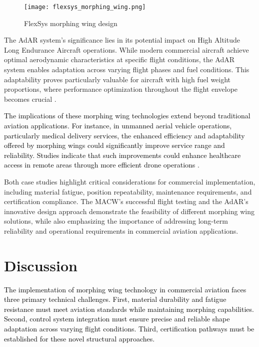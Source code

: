 \documentclass[letterpaper, journal, twoside]{IEEEtran}
\newcommand{\revision}[1]{\textcolor{black}{ #1}}
\begin{document}
\begin{figure}
    \centering
    \texttt{[image: flexsys\_morphing\_wing.png]}
    \caption{FlexSys morphing wing design~\cite{flexsys2024flexfoil}}
    \label{fig:flexsys_morphing_wing}
\end{figure}


The AdAR system's significance lies in its potential impact on High Altitude Long Endurance Aircraft operations. While modern commercial aircraft achieve optimal aerodynamic characteristics at specific flight conditions, the AdAR system enables adaptation across varying flight phases and fuel conditions. This adaptability proves particularly valuable for aircraft with high fuel weight proportions, where performance optimization throughout the flight envelope becomes crucial \cite{woods2015adaptive}.

\revision{The implications of these morphing wing technologies extend beyond traditional aviation applications. For instance, in unmanned aerial vehicle operations, particularly medical delivery services, the enhanced efficiency and adaptability offered by morphing wings could significantly improve service range and reliability. Studies indicate that such improvements could enhance healthcare access in remote areas through more efficient drone operations} \cite{ling2019aerial}.

Both case studies highlight critical considerations for commercial implementation, including material fatigue, position repeatability, maintenance requirements, and certification compliance. The MACW's successful flight testing and the AdAR's innovative design approach demonstrate the feasibility of different morphing wing solutions, while also emphasizing the importance of addressing long-term reliability and operational requirements in commercial aviation applications.

\section{Discussion}\label{sec:discussion}
\revision{The implementation of morphing wing technology in commercial aviation faces three primary technical challenges. First, material durability and fatigue resistance must meet aviation standards while maintaining morphing capabilities. Second, control system integration must ensure precise and reliable shape adaptation across varying flight conditions. Third, certification pathways must be established for these novel structural approaches.}
\end{document}
